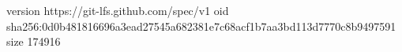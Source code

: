 version https://git-lfs.github.com/spec/v1
oid sha256:0d0b481816696a3ead27545a682381e7c68acf1b7aa3bd113d7770c8b9497591
size 174916
